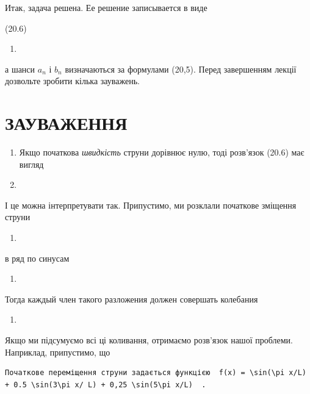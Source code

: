 \documentclass[
  ukrainian,
]{article}
\providecommand{\tightlist}{%
  \setlength{\itemsep}{0pt}\setlength{\parskip}{0pt}}
\begin{document}
Итак, задача решена. Ее решение записывается в виде

(20.6)

\begin{enumerate}
\def\labelenumi{\arabic{enumi}.}
\setcounter{enumi}{12}
\tightlist
\item
\end{enumerate}

а шанси \(a_n\) і \(b_n\) визначаються за формулами (20,5). Перед
завершенням лекції дозвольте зробити кілька зауважень.

\section{ЗАУВАЖЕННЯ}\label{ux437ux430ux443ux432ux430ux436ux435ux43dux43dux44f-7}

\begin{enumerate}
\def\labelenumi{\arabic{enumi}.}
\item
  Якщо початкова \emph{швидкість} струни дорівнює нулю, тоді розв'язок
  (20.6) має вигляд
\item
\end{enumerate}

І це можна інтерпретувати так. Припустимо, ми розклали початкове
зміщення струни

\begin{enumerate}
\def\labelenumi{\arabic{enumi}.}
\setcounter{enumi}{14}
\tightlist
\item
\end{enumerate}

в ряд по синусам

\begin{enumerate}
\def\labelenumi{\arabic{enumi}.}
\setcounter{enumi}{15}
\tightlist
\item
\end{enumerate}

Тогда каждый член такого разложения должен совершать колебания

\begin{enumerate}
\def\labelenumi{\arabic{enumi}.}
\setcounter{enumi}{16}
\tightlist
\item
\end{enumerate}

Якщо ми підсумуємо всі ці коливання, отримаємо розв'язок нашої проблеми.
Наприклад, припустимо, що

\begin{verbatim}
Початкове переміщення струни задається функцією  f(x) = \sin(\pi x/L) + 0.5 \sin(3\pi x/ L) + 0,25 \sin(5\pi x/L)  .
\end{verbatim}
\end{document}
